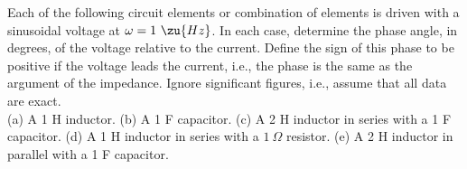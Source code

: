 Each of the following circuit elements or combination of elements is driven with a sinusoidal voltage at $\omega=1\ \zu{Hz}$.
In each case, determine the phase angle, in degrees, of the voltage relative to the current.
Define the sign of this phase to be positive if the voltage leads the current,
i.e., the phase is the same as the argument of the impedance. Ignore significant figures, i.e.,
assume that all data are exact.\\
(a) A 1 H inductor.\answercheck\hwendpart
(b) A 1 F capacitor.\answercheck\hwendpart
(c) A 2 H inductor in series with a 1 F capacitor.\answercheck\hwendpart
(d) A 1 H inductor in series with a $1\ \Omega$ resistor.\answercheck\hwendpart
(e) A 2 H inductor in parallel with a 1 F capacitor.\answercheck

